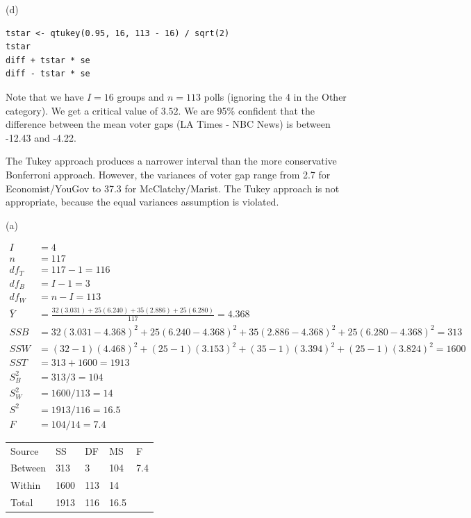 \documentclass[11pt]{article}
\begin{document}
\noindent (d)

\begin{verbatim}
tstar <- qtukey(0.95, 16, 113 - 16) / sqrt(2)
tstar
diff + tstar * se
diff - tstar * se
\end{verbatim}

Note that we have $I = 16$ groups and $n = 113$ polls (ignoring the 4 in the Other category).  We get a critical value of $3.52$.  We are 95\% confident that the difference between the mean voter gaps (LA Times - NBC News) is between -12.43 and -4.22.

The Tukey approach produces a narrower interval than the more conservative Bonferroni approach.  However, the variances of voter gap range from 2.7 for Economist/YouGov to 37.3 for McClatchy/Marist.  The Tukey approach is not appropriate, because the equal variances assumption is violated.

\pagebreak


\noindent (a)

\begin{align*}
I &= 4\\
n &= 117\\
df_T &= 117 - 1 = 116\\
df_B &= I - 1 = 3\\
df_W &= n - I = 113\\
\bar{Y} &= \frac{32(3.031) + 25(6.240) + 35(2.886) + 25(6.280)}{117} = 4.368\\
SSB &= 32(3.031 - 4.368)^2 + 25(6.240 - 4.368)^2 + 35(2.886 - 4.368)^2 + 25(6.280 - 4.368)^2 = 313\\
SSW &= (32 - 1)(4.468)^2 + (25 - 1)(3.153)^2 + (35 - 1)(3.394)^2 + (25 - 1)(3.824)^2 = 1600\\
SST &= 313 + 1600 = 1913\\
S^2_B &= 313 / 3 = 104\\
S^2_W &= 1600 / 113 = 14\\
S^2 &= 1913 / 116 = 16.5\\
F &= 104 / 14 = 7.4
\end{align*}

\begin{center}
  \begin{tabular}{lllll}
Source & SS & DF & MS & F\\
Between & 313 & 3 & 104 & 7.4\\
Within & 1600 & 113 & 14 &\\
Total & 1913 & 116 & 16.5
  \end{tabular}
\end{center}
\end{document}
